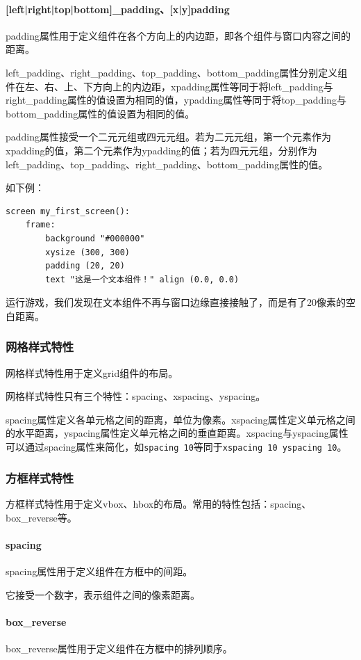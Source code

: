 \documentclass[../../Main.tex]{subfiles}
\begin{document}
\paragraph{[left|right|top|bottom]\_padding、[x|y]padding}
padding属性用于定义组件在各个方向上的内边距，即各个组件与窗口内容之间的距离。

left\_padding、right\_padding、top\_padding、bottom\_padding属性分别定义组件在左、右、上、下方向上的内边距，xpadding属性等同于将left\_padding与right\_padding属性的值设置为相同的值，ypadding属性等同于将top\_padding与bottom\_padding属性的值设置为相同的值。

padding属性接受一个二元元组或四元元组。若为二元元组，第一个元素作为xpadding的值，第二个元素作为ypadding的值；若为四元元组，分别作为left\_padding、top\_padding、right\_padding、bottom\_padding属性的值。

如下例：
\begin{lstlisting}
screen my_first_screen():
    frame:
        background "#000000"
        xysize (300, 300)
        padding (20, 20)
        text "这是一个文本组件！" align (0.0, 0.0)
\end{lstlisting}

运行游戏，我们发现在文本组件不再与窗口边缘直接接触了，而是有了20像素的空白距离。

\subsubsection{网格样式特性}
网格样式特性用于定义grid组件的布局。

网格样式特性只有三个特性：spacing、xspacing、yspacing。

spacing属性定义各单元格之间的距离，单位为像素。xspacing属性定义单元格之间的水平距离，yspacing属性定义单元格之间的垂直距离。xspacing与yspacing属性可以通过spacing属性来简化，如\verb|spacing 10|等同于\verb|xspacing 10 yspacing 10|。
\subsubsection{方框样式特性}
方框样式特性用于定义vbox、hbox的布局。常用的特性包括：spacing、box\_reverse等。
\paragraph{spacing}
spacing属性用于定义组件在方框中的间距。

它接受一个数字，表示组件之间的像素距离。

\paragraph{box\_reverse}
box\_reverse属性用于定义组件在方框中的排列顺序。
\end{document}
